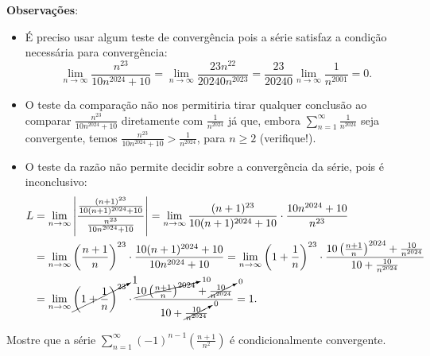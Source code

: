 \documentclass[12pt,a4paper]{article}
\begin{document}
\begin{ExerciseList}
\textbf{Observações}:
\begin{itemize}
\item É preciso usar algum teste de convergência pois a série satisfaz a condição necessária para convergência:
\[
\lim_{n\to\infty} \frac{n^{23}}{10n^{2024} + 10}
= \lim_{n\to\infty} \frac{23n^{22}}{20240n^{2023}}
= \frac{23}{20240} \lim_{n\to\infty} \frac{1}{n^{2001}}
= 0.
\]
\item O teste da comparação não nos permitiria tirar qualquer conclusão ao comparar \(\frac{n^{23}}{10n^{2024} + 10}\) diretamente com \(\frac{1}{n^{2024}}\) já que, embora \(\sum_{n=1}^{\infty} \frac{1}{n^{2024}}\) seja convergente, temos $\frac{n^{23}}{10n^{2024} + 10} > \frac{1}{n^{2024}}$, para $n\geq 2$ (verifique!).
\item O teste da razão não permite decidir sobre a convergência da série, pois é inconclusivo:
\begin{align*}
L
& = \lim_{n \to \infty} \left|\frac{\frac{(n+1)^{23}}{10(n+1)^{2024} + 10}}{\frac{n^{23}}{10n^{2024} + 10}}\right|
= \lim_{n \to \infty} \frac{(n+1)^{23}}{10(n+1)^{2024} + 10} \cdot\frac{10n^{2024} + 10}{n^{23}} \\
& = \lim_{n \to \infty} \left(\frac{n+1}{n}\right)^{23} \cdot \frac{10(n+1)^{2024} + 10}{10n^{2024} + 10}
  = \lim_{n \to \infty} \left(1+\frac{1}{n}\right)^{23} \cdot \frac{10\left(\frac{n+1}{n}\right)^{2024} + \frac{10}{n^{2024}}}{10 + \frac{10}{n^{2024}}} \\
& = \lim_{n \to \infty} \cancelto{1}{\left(1+\frac{1}{n}\right)^{23}} \cdot \frac{\cancelto{10}{10\left(\frac{n+1}{n}\right)^{2024}} + \cancelto{0}{\frac{10}{n^{2024}}}}{10 + \cancelto{0}{\frac{10}{n^{2024}}}}
= 1.
\end{align*}
\end{itemize}

\Exercise[title={2,5}] Mostre que a série \(\sum_{n=1}^{\infty} (-1)^{n-1}\left(\frac{n+1}{n^2}\right)\) é condicionalmente convergente.


\end{ExerciseList}
\end{document}

